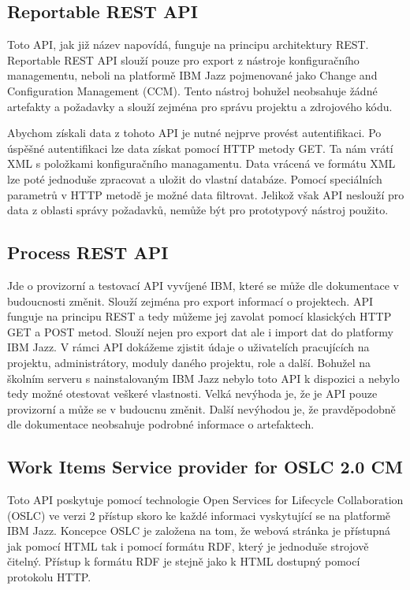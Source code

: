 \documentclass[czech,master]{diploma}
\begin{document}
\subsection{Reportable REST API}
Toto API, jak již název napovídá, funguje na principu architektury REST. Reportable REST API slouží pouze pro export z nástroje konfiguračního managementu, neboli na platformě IBM Jazz pojmenované jako Change and Configuration Management (CCM). Tento nástroj bohužel neobsahuje žádné artefakty a požadavky a slouží zejména pro správu projektu a zdrojového kódu.

Abychom získali data z tohoto API je nutné nejprve provést autentifikaci. Po úspěšné autentifikaci lze data získat pomocí HTTP metody GET. Ta nám vrátí XML s položkami konfiguračního managamentu. Data vrácená ve formátu XML lze poté jednoduše zpracovat a uložit do vlastní databáze. Pomocí speciálních parametrů v HTTP metodě je možné data filtrovat. Jelikož však API neslouží pro data z oblasti správy požadavků, nemůže být pro prototypový nástroj použito.

\subsection{Process REST API}
Jde o provizorní a testovací API vyvíjené IBM, které se může dle dokumentace v budoucnosti změnit. Slouží zejména pro export informací o projektech. API funguje na principu REST a tedy můžeme jej zavolat pomocí klasických HTTP GET a POST metod. Slouží nejen pro export dat ale i import dat do platformy IBM Jazz. V rámci API dokážeme zjistit údaje o uživatelích pracujících na projektu, administrátory, moduly daného projektu, role a další. Bohužel na školním serveru s nainstalovaným IBM Jazz nebylo toto API k dispozici a nebylo tedy možné otestovat veškeré vlastnosti. Velká nevýhoda je, že je API pouze provizorní a může se v budoucnu změnit. Další nevýhodou je, že pravděpodobně dle dokumentace neobsahuje podrobné informace o artefaktech.

\subsection{Work Items Service provider for OSLC 2.0 CM}
Toto API poskytuje pomocí technologie Open Services for Lifecycle Collaboration (OSLC) ve verzi 2 přístup skoro ke každé informaci vyskytující se na platformě IBM Jazz. Koncepce OSLC je založena na tom, že webová stránka je přístupná jak pomocí HTML tak i pomocí formátu RDF, který je jednoduše strojově čitelný. Přístup k formátu RDF je stejně jako k HTML dostupný pomocí protokolu HTTP.
\end{document}
